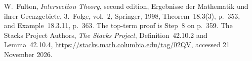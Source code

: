 W.~Fulton, \emph{Intersection Theory}, second edition,
Ergebnisse der Mathematik und ihrer Grenzgebiete, 3.~Folge, vol.~2,
Springer, 1998, Theorem~18.3(3), p.~353, and Example~18.3.11, p.~363.
The top-term proof is Step~8 on p.~359.
The Stacks Project Authors, \emph{The Stacks Project},
Definition~42.10.2 and Lemma~42.10.4,
\url{https://stacks.math.columbia.edu/tag/02QV}, accessed 21 November 2026.
